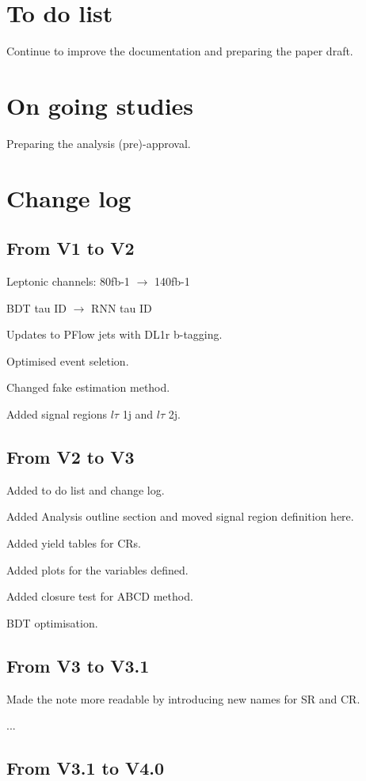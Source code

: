 \section{To do list}

Continue to improve the documentation and preparing the paper draft.

\section{On going studies}

Preparing the analysis (pre)-approval.

\section{Change log}

\subsection{From V1 to V2}

Leptonic channels:  80fb-1 $\to$ 140fb-1

BDT tau ID $\to$ RNN tau ID

Updates to PFlow jets with DL1r b-tagging.

Optimised event seletion.

Changed fake estimation method.

Added signal regions $l\tau$ 1j and $l\tau$ 2j.

\subsection{From V2 to V3}

Added to do list and change log.

Added Analysis outline section and moved signal region definition here.

Added yield tables for CRs.

Added plots for the variables defined.

Added closure test for ABCD method.

BDT optimisation.

\subsection{From V3 to V3.1}

Made the note more readable by introducing new names for SR and CR.

...
\subsection{From V3.1 to V4.0}

